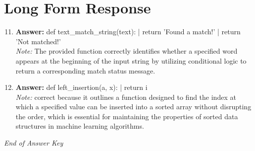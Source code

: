 \documentclass[12pt]{article}
\begin{document}
\section*{Long Form Response}
\begin{enumerate}[label=\arabic*.]
\setcounter{enumi}{10}
\item \textbf{Answer:} def text\_match\_string(text): | return 'Found a match!' | return 'Not matched!'
\\ \textit{Note:} The provided function correctly identifies whether a specified word appears at the beginning of the input string by utilizing conditional logic to return a corresponding match status message.
\item \textbf{Answer:} def left\_insertion(a, x): | return i
\\ \textit{Note:} correct because it outlines a function designed to find the index at which a specified value can be inserted into a sorted array without disrupting the order, which is essential for maintaining the properties of sorted data structures in machine learning algorithms.
\end{enumerate}

\vfill
\noindent\textit{End of Answer Key}
\end{document}
